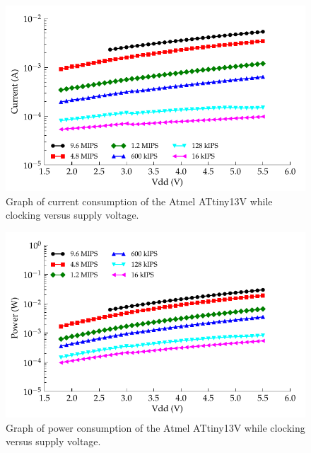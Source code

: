 \begin{figure}
\begin{centering}
\includegraphics{content/appendices/microprocessorPowerMeasurements/graphics/Graph_ATtiny13V_Clock_Current}
\par\end{centering}

\protect\caption{
\label{fig:ATtiny13VClkCurrent}Graph of current consumption of the Atmel ATtiny13V while clocking versus supply voltage.
}


\end{figure}

\begin{figure}
  \centering
  \includegraphics{content/appendices/microprocessorPowerMeasurements/graphics/Graph_ATtiny13V_Clock_Power}
  \caption{
  \label{fig:ATtiny13VClkPower}Graph of power consumption of the Atmel ATtiny13V
  while clocking versus supply voltage.
  }
\end{figure}

